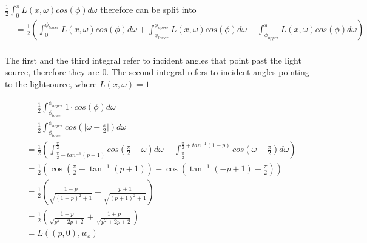 \documentclass[a4paper]{scrartcl}
\begin{document}
    $ \frac{1}{2}\int_{0}^\pi L(x,\omega)cos(\phi)d\omega$ therefore can be split into 
    \begin{align*}
      &=\frac{1}{2}(\int_{0}^{\phi_{lower}} L(x,\omega)cos(\phi)d\omega + \int_{\phi_{lower}}^{\phi_{upper}} L(x,\omega)cos(\phi)d\omega + \int_{\phi_{upper}}^{\pi} L(x,\omega)cos(\phi)d\omega)\\
    \end{align*}
    
    The first and the third integral refer to incident angles that point past the light source, 
    therefore they are 0. The second integral refers to incident angles pointing to the lightsource, where $L(x,\omega) = 1$
    
    \begin{align*}
      &=\frac{1}{2} \int_{\phi_{lower}}^{\phi_{upper}} 1\cdot cos(\phi)d\omega\\
      &=\frac{1}{2} \int_{\phi_{lower}}^{\phi_{upper}} cos(\lvert \omega - \frac{\pi}{2} \rvert)d\omega \\
      &= \frac{1}{2} \left( \int_{\frac{\pi}{2} - tan^{-1}(p+1)}^{\frac{\pi}{2}} cos(\frac{\pi}{2} - \omega )d\omega +  \int_{\frac{\pi}{2}}^{\frac{\pi}{2} + tan^{-1}(1-p)}cos(\omega - \frac{\pi}{2} )d\omega\right)\\
      &= \frac{1}{2}\left(\cos \left(\frac{\pi }{2}-\tan^{-1} \left(p+1\right)\right)-\cos \left(\tan^{-1} \left(-p+1\right)+\frac{\pi }{2}\right)\right) \\
      &= \frac{1}{2}\left( \frac{1-p}{\sqrt{(1-p)^2 + 1}} + \frac{p+1}{\sqrt{(p+1)^2 + 1}} \right) \\
      &= \frac{1}{2} \left( \frac{1-p}{\sqrt{p^2 - 2p + 2}} + \frac{1+p}{\sqrt{p^2 + 2p + 2}} \right) \\
      &= L((p,0), w_o)
    \end{align*}

\end{document}
